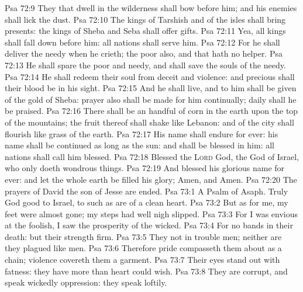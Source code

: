 \vs Psa 72:9 They that dwell in the wilderness shall bow before him; and his enemies shall lick the dust.
\vs Psa 72:10 The kings of Tarshish and of the isles shall bring presents: the kings of Sheba and Seba shall offer gifts.
\vs Psa 72:11 Yea, all kings shall fall down before him: all nations shall serve him.
\vs Psa 72:12 For he shall deliver the needy when he crieth; the poor also, and  that hath no helper.
\vs Psa 72:13 He shall spare the poor and needy, and shall save the souls of the needy.
\vs Psa 72:14 He shall redeem their soul from deceit and violence: and precious shall their blood be in his sight.
\vs Psa 72:15 And he shall live, and to him shall be given of the gold of Sheba: prayer also shall be made for him continually;  daily shall he be praised.
\vs Psa 72:16 There shall be an handful of corn in the earth upon the top of the mountains; the fruit thereof shall shake like Lebanon: and  of the city shall flourish like grass of the earth.
\vs Psa 72:17 His name shall endure for ever: his name shall be continued as long as the sun: and  shall be blessed in him: all nations shall call him blessed.
\vs Psa 72:18 Blessed  the \textsc{Lord} God, the God of Israel, who only doeth wondrous things.
\vs Psa 72:19 And blessed  his glorious name for ever: and let the whole earth be filled  his glory; Amen, and Amen.
\vs Psa 72:20 The prayers of David the son of Jesse are ended.
\vs Psa 73:1 A Psalm of Asaph. Truly God  good to Israel,  to such as are of a clean heart.
\vs Psa 73:2 But as for me, my feet were almost gone; my steps had well nigh slipped.
\vs Psa 73:3 For I was envious at the foolish,  I saw the prosperity of the wicked.
\vs Psa 73:4 For  no bands in their death: but their strength  firm.
\vs Psa 73:5 They  not in trouble  men; neither are they plagued like  men.
\vs Psa 73:6 Therefore pride compasseth them about as a chain; violence covereth them  a garment.
\vs Psa 73:7 Their eyes stand out with fatness: they have more than heart could wish.
\vs Psa 73:8 They are corrupt, and speak wickedly  oppression: they speak loftily.
